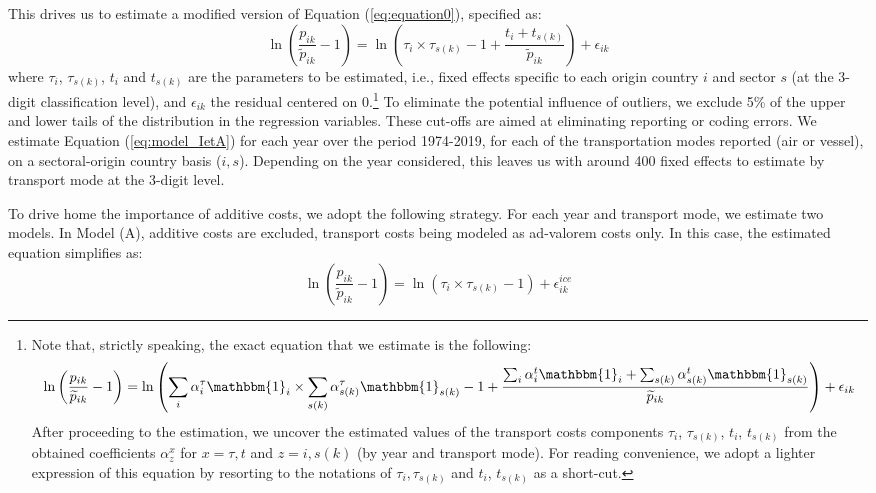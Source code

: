 \documentclass[a4paper,11pt]{article}
\begin{document}
This drives us to estimate a modified version of Equation (\ref{eq:equation0}), specified as:
\begin{equation}
\ln\left(\frac{p_{ik}}{\widetilde{p}_{ik}}-1 \right)= \ln \left(\tau_{i}\times \tau_{s(k)} -1+\frac{t_{i} + t_{s(k)}}{\widetilde{p}_{ik}} \right) + \epsilon_{ik} \label{eq:model_IetA}
\end{equation}
where $\tau_{i}$, $\tau_{s(k)}$, $t_{i}$ and $t_{s(k)}$ are the parameters to be estimated, i.e., fixed effects specific to each origin country $i$ and sector $s$ (at the 3-digit classification level), and $\epsilon_{ik}$ the residual centered on 0.\footnote{Note that, strictly speaking, the exact equation that we estimate is the following:
$$\ln\left(\frac{p_{ik}}{\widetilde{p}_{ik}}-1 \right)= \ln \left(\sum_i \alpha_i^\tau \mathbbm{1}_i \times \sum_{s(k)}\alpha_{s(k)}^\tau \mathbbm{1}_{s(k)}-1 + \frac{\sum_i\alpha_i^t\mathbbm{1}_i + \sum_{s(k)}\alpha^t_{s(k)}\mathbbm{1}_{s(k)}}{\widetilde{p}_{ik}}\right)+\epsilon_{ik} $$
After proceeding to the estimation, we uncover the estimated values of the transport costs components $\tau_{i}$, $\tau_{s(k)}$, $t_{i}$, $t_{s(k)}$ from the obtained coefficients $\alpha^{x}_{z}$ for $x=\tau,t$ and $z=i,s(k)$ (by year and transport mode).
For reading convenience, we adopt a lighter expression of this equation by resorting to the notations of $\tau_i,\tau_{s(k)}$ and $t_i$, $t_{s(k)}$ as a short-cut.}  To eliminate the potential influence of outliers, we exclude 5\% of the upper and lower tails of the distribution in the regression variables.
These cut-offs are aimed at eliminating reporting or coding errors.
We estimate Equation (\ref{eq:model_IetA}) for each year over the period 1974-2019, for each of the transportation modes reported (air or vessel), on a sectoral-origin country basis ($i,s$). Depending on the year considered, this leaves us with around 400 fixed effects to estimate by transport mode at the 3-digit level.  \medskip

To drive home the importance of additive costs, we adopt the following strategy. For each year and transport mode, we estimate two models. In Model (A), additive costs are excluded, transport costs being modeled as ad-valorem costs only. In this case, the estimated equation simplifies as:
\begin{equation}
\ln\left(\frac{p_{ik}}{\widetilde{p}_{ik}}-1 \right)= \ln \left(\tau_{i}\times\tau_{s(k)}-1 \right) + \epsilon^{ice}_{ik} \label{eq:model_nlI}
\end{equation}
\end{document}
